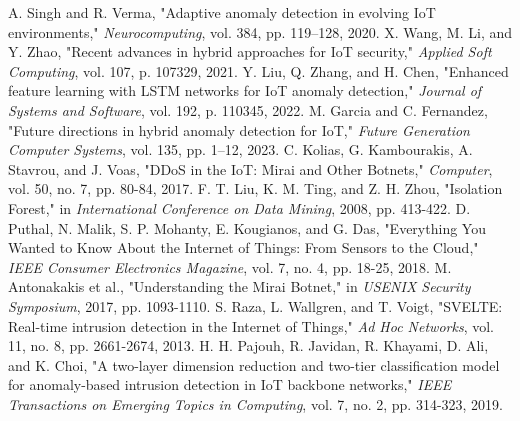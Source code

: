 \documentclass[conference]{IEEEtran}
\begin{document}
\begin{thebibliography}{00}
 A. Singh and R. Verma, "Adaptive anomaly detection in evolving IoT environments," \textit{Neurocomputing}, vol. 384, pp. 119–128, 2020.
 X. Wang, M. Li, and Y. Zhao, "Recent advances in hybrid approaches for IoT security," \textit{Applied Soft Computing}, vol. 107, p. 107329, 2021.
 Y. Liu, Q. Zhang, and H. Chen, "Enhanced feature learning with LSTM networks for IoT anomaly detection," \textit{Journal of Systems and Software}, vol. 192, p. 110345, 2022.
 M. Garcia and C. Fernandez, "Future directions in hybrid anomaly detection for IoT," \textit{Future Generation Computer Systems}, vol. 135, pp. 1–12, 2023.
 C. Kolias, G. Kambourakis, A. Stavrou, and J. Voas, "DDoS in the IoT: Mirai and Other Botnets," \textit{Computer}, vol. 50, no. 7, pp. 80-84, 2017.
 F. T. Liu, K. M. Ting, and Z. H. Zhou, "Isolation Forest," in \textit{International Conference on Data Mining}, 2008, pp. 413-422.
 D. Puthal, N. Malik, S. P. Mohanty, E. Kougianos, and G. Das, "Everything You Wanted to Know About the Internet of Things: From Sensors to the Cloud," \textit{IEEE Consumer Electronics Magazine}, vol. 7, no. 4, pp. 18-25, 2018.
 M. Antonakakis et al., "Understanding the Mirai Botnet," in \textit{USENIX Security Symposium}, 2017, pp. 1093-1110.
 S. Raza, L. Wallgren, and T. Voigt, "SVELTE: Real-time intrusion detection in the Internet of Things," \textit{Ad Hoc Networks}, vol. 11, no. 8, pp. 2661-2674, 2013.
 H. H. Pajouh, R. Javidan, R. Khayami, D. Ali, and K. Choi, "A two-layer dimension reduction and two-tier classification model for anomaly-based intrusion detection in IoT backbone networks," \textit{IEEE Transactions on Emerging Topics in Computing}, vol. 7, no. 2, pp. 314-323, 2019.
\end{thebibliography}
\end{document}
